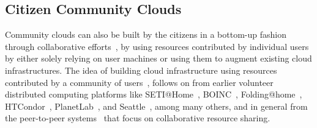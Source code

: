 

\subsection{Citizen Community Clouds}
\label{sec__community_clouds_citizens}

Community clouds can also be built by the citizens in a bottom-up fashion through collaborative efforts~\cite{Khan2015Current}, 
by using resources contributed by individual users by either solely relying on user machines or using them to augment existing cloud infrastructures.
The idea of building cloud infrastructure using resources contributed by a community of users~\cite{Marinos2009}, 
follows on from earlier volunteer distributed computing platforms like
	SETI@Home~\cite{Anderson2002}, 
	BOINC~\cite{Anderson2004},
	Folding@home~\cite{Beberg2009}, 
	HTCondor~\cite{Thain2005}, 
	PlanetLab~\cite{Chun2003}, and
	Seattle~\cite{Cappos2009}, among many others,
and in general from the peer-to-peer systems~\cite{Shen2010} that focus on collaborative resource sharing.

